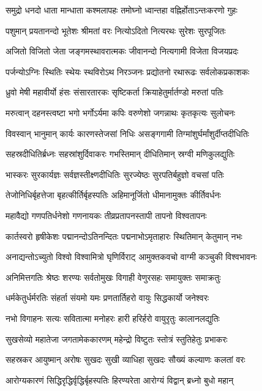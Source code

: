 \twolineshloka
{समुद्रो धनदो धाता मान्धाता कश्मलापहः}
{तमोघ्नो ध्वान्तहा वह्निर्होताऽन्तःकरणो गुहः}%

\twolineshloka
{पशुमान् प्रयतानन्दो भूतेशः श्रीमतां वरः}
{नित्योऽदितो नित्यरथः सुरेशः सुरपूजितः}%

\twolineshloka
{अजितो विजितो जेता जङ्गमस्थावरात्मकः}
{जीवानन्दो नित्यगामी विजेता विजयप्रदः}%

\twolineshloka
{पर्जन्योऽग्निः स्थितिः स्थेयः स्थविरोऽथ निरञ्जनः}
{प्रद्योतनो रथारूढः सर्वलोकप्रकाशकः}%

\twolineshloka
{ध्रुवो मेषी महावीर्यो हंसः संसारतारकः}
{सृष्टिकर्ता क्रियाहेतुर्मार्तण्डो मरुतां पतिः}%

\twolineshloka
{मरुत्वान् दहनस्त्वष्टा भगो भर्गोऽर्यमा कपिः}
{वरुणेशो जगन्नाथः कृतकृत्यः सुलोचनः}%

\twolineshloka
{विवस्वान् भानुमान् कार्यः कारणस्तेजसां निधिः}
{असङ्गगामी तिग्मांशुर्घर्मांशुर्दीप्तदीधितिः}%

\twolineshloka
{सहस्रदीधितिर्ब्रध्नः सहस्रांशुर्दिवाकरः}
{गभस्तिमान् दीधितिमान् स्रग्वी मणिकुलद्युतिः}%

\twolineshloka
{भास्करः सुरकार्यज्ञः सर्वज्ञस्तीक्ष्णदीधितिः}
{सुरज्येष्ठः सुरपतिर्बहुज्ञो वचसां पतिः}%

\twolineshloka
{तेजोनिधिर्बृहत्तेजा बृहत्कीर्तिर्बृहस्पतिः}
{अहिमानूर्जितो धीमानामुक्तः कीर्तिवर्धनः}%

\twolineshloka
{महावैद्यो गणपतिर्धनेशो गणनायकः}
{तीव्रप्रतापनस्तापी तापनो विश्वतापनः}%

\twolineshloka
{कार्तस्वरो हृषीकेशः पद्मानन्दोऽतिनन्दितः}
{पद्मनाभोऽमृताहारः स्थितिमान् केतुमान् नभः}%

\twolineshloka
{अनाद्यन्तोऽच्युतो विश्वो विश्वामित्रो घृणिर्विराट्}
{आमुक्तकवचो वाग्मी कञ्चुकी विश्वभावनः}%

\twolineshloka
{अनिमित्तगतिः श्रेष्ठः शरण्यः सर्वतोमुखः}
{विगाही वेणुरसहः समायुक्तः समाक्रतुः}%

\twolineshloka
{धर्मकेतुर्धर्मरतिः संहर्ता संयमो यमः}
{प्रणतार्तिहरो वायुः सिद्धकार्यो जनेश्वरः}%

\twolineshloka
{नभो विगाहनः सत्यः सवितात्मा मनोहरः}
{हारी हरिर्हरो वायुरृतुः कालानलद्युतिः}%

\twolineshloka
{सुखसेव्यो महातेजा जगतामेककारणम्}
{महेन्द्रो विष्टुतः स्तोत्रं स्तुतिहेतुः प्रभाकरः}%

\twolineshloka
{सहस्रकर आयुष्मान् अरोषः सुखदः सुखी}
{व्याधिहा सुखदः सौख्यं कल्याणः कलतां वरः}%

\twolineshloka
{आरोग्यकारणं सिद्धिरृद्धिर्वृद्धिर्बृहस्पतिः}
{हिरण्यरेता आरोग्यं विद्वान् ब्रध्नो बुधो महान्}%


